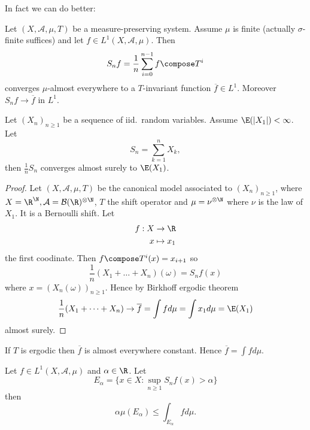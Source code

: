 \documentclass[a4paper]{article}
\begin{document}
In fact we can do better:

\begin{theorem}
  \label{thm:Birkhoff ergodic theorem}
  Let \((X, \mathcal A, \mu, T)\) be a measure-preserving system. Assume \(\mu\) is finite (actually \(\sigma\)-finite suffices) and let \(f \in L^1(X, \mathcal A, \mu)\). Then
  \[
    S_nf = \frac{1}{n} \sum_{i = 0}^{n - 1} f \compose T^i
  \]
  converges \(\mu\)-almost everywhere to a \(T\)-invariant function \(\overline f \in L^1\). Moreover \(S_n f \to \overline f\) in \(L^1\).
\end{theorem}


\begin{corollary}
  Let \((X_n)_{n \geq 1}\) be a sequence of iid.\ random variables. Assume \(\E(|X_1|) < \infty\). Let
  \[
    S_n = \sum_{k = 1}^n X_k,
  \]
  then \(\frac{1}{n} S_n\) converges almost surely to \(\E(X_1)\).
\end{corollary}

\begin{proof}
  Let \((X, \mathcal A, \mu, T)\) be the canonical model associated to \((X_n)_{n \geq 1}\), where \(X = \R^\N, \mathcal A = \mathcal B(\R)^{\otimes \N}\), \(T\) the shift operator and \(\mu = \nu^{\otimes \N}\) where \(\nu\) is the law of \(X_1\). It is a Bernoulli shift. Let
  \begin{align*}
    f: X &\to \R \\
    x &\mapsto x_1
  \end{align*}
  the first coodinate. Then \(f \compose T^i(x) = x_{i + 1}\) so
  \[
    \frac{1}{n}(X_1 + \dots + X_n) (\omega) = S_nf(x)
  \]
  where \(x = (X_n(\omega))_{n \geq 1}\). Hence by Birkhoff ergodic theorem
  \[
    \frac{1}{n}(X_1 + \dots + X_n)
    \to \overline f = \int f d\mu = \int x_1 d\mu = \E(X_1)
  \]
  almost surely.
\end{proof}

\begin{remark}
  If \(T\) is ergodic then \(\overline f\) is almost everywhere constant. Hence \(\overline f = \int f d\mu\).
\end{remark}

\begin{lemma}
  \label{lem:maximal ergodic lemma}
  Let \(f \in L^1(X, \mathcal A, \mu)\) and \(\alpha \in \R\). Let
  \[
    E_\alpha = \{x \in X: \sup_{n \geq 1} S_nf(x) > \alpha\}
  \]
  then
  \[
    \alpha \mu(E_\alpha) \leq \int_{E_\alpha} f d\mu.
  \]
\end{lemma}
\end{document}
